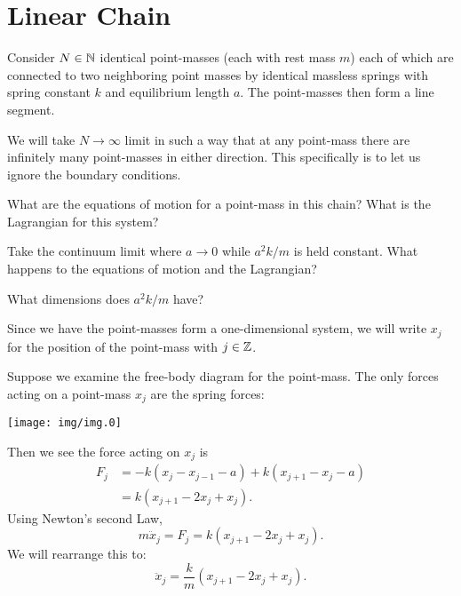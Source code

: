\section{Linear Chain}

Consider $N\in\mathbb{N}$ identical point-masses (each with rest mass $m$)
each of which are connected to two neighboring point masses by identical
massless springs with spring constant $k$ and equilibrium length $a$.
The point-masses then form a line segment.

We will take $N\to\infty$ limit in such a way that at any point-mass
there are infinitely many point-masses in either direction.
This specifically is to let us ignore the boundary conditions.

What are the equations of motion for a point-mass in this chain? What is
the Lagrangian for this system?

Take the continuum limit where $a\to0$ while $a^{2}k/m$ is held
constant. What happens to the equations of motion and the Lagrangian?

\begin{exercise}
What dimensions does $a^{2}k/m$ have?
\end{exercise}

Since we have the point-masses form a one-dimensional system, we will
write $x_{j}$ for the position of the point-mass with $j\in\mathbb{Z}$.

Suppose we examine the free-body diagram for the point-mass. The only
forces acting on a point-mass $x_{j}$ are the spring forces:
\begin{center}
\texttt{[image: img/img.0]}
\end{center}

Then we see the force acting on $x_{j}$ is
\begin{equation}
\begin{split}
  F_{j} &= -k(x_{j}-x_{j-1}-a) + k(x_{j+1}-x_{j}-a)\\
  &= k(x_{j+1}-2x_{j}+x_{j}).
\end{split}
\end{equation}
Using Newton's second Law,
\begin{equation}
m\ddot{x}_{j} = F_{j} = k(x_{j+1}-2x_{j}+x_{j}).
\end{equation}
We will rearrange this to:
\begin{equation}\label{eq:classical-field-theory:linear-chain:newton-eom}
\ddot{x}_{j} = \frac{k}{m}(x_{j+1}-2x_{j}+x_{j}).
\end{equation}


